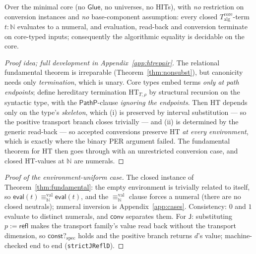 \documentclass{lmcs}
\newcommand{\refl}{\mathsf{refl}}
\newcommand{\J}{\mathsf{J}}
\newcommand{\Glue}{\mathsf{Glue}}
\newcommand{\valeq}{\equiv^{\mathrm{val}}}
\newcommand{\evalop}{\mathsf{eval}}
\newcommand{\constspec}{\mathsf{const?}_{\mathrm{spec}}}
\newcommand{\convop}{\mathsf{conv}}
\begin{document}
\begin{thm}
  \label{thm:canonregained}
  Over the minimal core (no $\Glue$, no universes, no HITs), with
  \emph{no} restriction on conversion instances and \emph{no}
  base-component assumption: every closed
  $T^{\mathrm{core}}_{\mathrm{alg}}$-term $t : \mathbb{N}$ evaluates
  to a numeral, and evaluation, read-back and conversion terminate
  on core-typed inputs; consequently the algorithmic equality is
  decidable on the core.
\end{thm}
\begin{proof}[Proof idea; full development in
  Appendix~\ref{app:htrepair}]
  The relational fundamental theorem is irreparable
  (Theorem~\ref{thm:nonsubst}), but canonicity needs only
  \emph{termination}, which is unary.  Core types embed terms
  \emph{only at path endpoints}; define hereditary termination
  $\mathrm{HT}_{T,\rho}$ by structural recursion on the syntactic
  type, with the $\mathsf{PathP}$-clause \emph{ignoring the
  endpoints}.  Then $\mathrm{HT}$ depends only on the type's
  \emph{skeleton}, which (i) is preserved by interval substitution
  --- so the positive transport branch closes trivially --- and
  (ii) is determined by the generic read-back --- so accepted
  conversions preserve $\mathrm{HT}$ \emph{at every environment},
  which is exactly where the binary PER argument failed.  The
  fundamental theorem for $\mathrm{HT}$ then goes through with an
  unrestricted conversion case, and closed $\mathrm{HT}$-values at
  $\mathbb{N}$ are numerals.
\end{proof}
\begin{proof}[Proof of the environment-uniform case]
  The closed instance of Theorem~\ref{thm:fundamental}: the empty
  environment is trivially related to itself, so
  $\evalop(t) \valeq_{\mathbb{N}} \evalop(t)$, and the
  $\valeq_{\mathbb{N}}$ clause forces a numeral (there are no closed
  neutrals); numeral inversion is
  Appendix~\ref{app:cases}.  Consistency: $0$ and $1$ evaluate to
  distinct numerals, and $\convop$ separates them.  For $\J$:
  substituting $p := \refl$ makes the transport family's value
  read back without the transport dimension, so
  $\constspec$ holds and the positive branch returns $d$'s value;
  machine-checked end to end (\texttt{strictJReflD}).
\end{proof}
\end{document}

